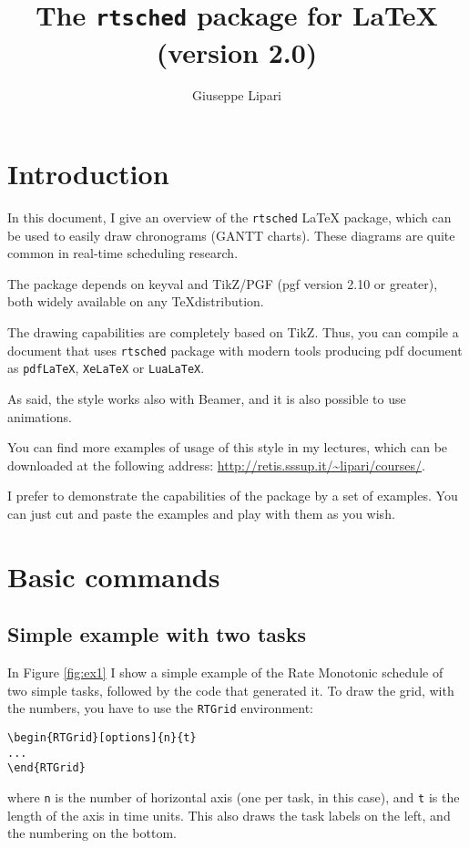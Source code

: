 \documentclass{article}
\title{The \texttt{rtsched} package for \LaTeX \\ (version 2.0)}
\author{Giuseppe Lipari}
\begin{document}
\maketitle

\listoffigures

\section{Introduction}

In this document, I give an overview of the \texttt{rtsched} \LaTeX
package, which can be used to easily draw chronograms (GANTT charts).
These diagrams are quite common in real-time scheduling research.

The package depends on keyval and TikZ/PGF (pgf version 2.10 or greater), both widely
available on any \TeX distribution.

The drawing capabilities are completely based on TikZ. Thus, you can compile
 a document that uses \texttt{rtsched} package with modern tools producing pdf document
as \texttt{pdfLaTeX}, \texttt{XeLaTeX} or \texttt{LuaLaTeX}.

As said, the style works also with Beamer, and it is also possible to
use animations.

You can find more examples of usage of this style in my lectures,
which can be downloaded at the following address:
\url{http://retis.sssup.it/~lipari/courses/}.

I prefer to demonstrate the capabilities of the package by a set of
examples. You can just cut and paste the examples and play with them
as you wish.

\section{Basic commands}

\subsection{Simple example with two tasks}

In Figure \ref{fig:ex1} I show a simple example of the Rate Monotonic
schedule of two simple tasks, followed by the code that generated it.
To draw the grid, with the numbers, you have to use the
\texttt{RTGrid} environment:
\begin{verbatim}
\begin{RTGrid}[options]{n}{t}
...
\end{RTGrid}
\end{verbatim}
\noindent where \texttt{n} is the number of horizontal axis (one per
task, in this case), and \texttt{t} is the length of the axis in time
units. This also draws the task labels on the left, and the numbering
on the bottom.
\end{document}
